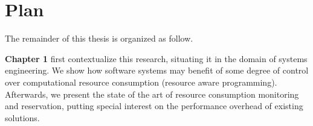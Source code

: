 %
%
%
%
%
%
%


\section{Plan}

The remainder of this thesis is organized as follow.

\textbf{Chapter 1} first contextualize this research, situating it in the domain of systems engineering.
We show how software systems may benefit of some degree of control over computational resource consumption (resource aware programming).
Afterwards, we present the state of the art of resource consumption monitoring and reservation, putting special interest on the performance overhead of existing solutions.

